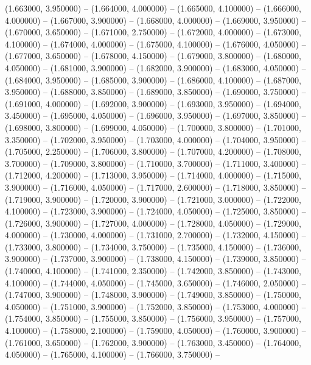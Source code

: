 (1.663000, 3.950000) -- 
(1.664000, 4.000000) -- 
(1.665000, 4.100000) -- 
(1.666000, 4.000000) -- 
(1.667000, 3.900000) -- 
(1.668000, 4.000000) -- 
(1.669000, 3.950000) -- 
(1.670000, 3.650000) -- 
(1.671000, 2.750000) -- 
(1.672000, 4.000000) -- 
(1.673000, 4.100000) -- 
(1.674000, 4.000000) -- 
(1.675000, 4.100000) -- 
(1.676000, 4.050000) -- 
(1.677000, 3.650000) -- 
(1.678000, 4.150000) -- 
(1.679000, 3.800000) -- 
(1.680000, 4.050000) -- 
(1.681000, 3.900000) -- 
(1.682000, 3.900000) -- 
(1.683000, 4.050000) -- 
(1.684000, 3.950000) -- 
(1.685000, 3.900000) -- 
(1.686000, 4.100000) -- 
(1.687000, 3.950000) -- 
(1.688000, 3.850000) -- 
(1.689000, 3.850000) -- 
(1.690000, 3.750000) -- 
(1.691000, 4.000000) -- 
(1.692000, 3.900000) -- 
(1.693000, 3.950000) -- 
(1.694000, 3.450000) -- 
(1.695000, 4.050000) -- 
(1.696000, 3.950000) -- 
(1.697000, 3.850000) -- 
(1.698000, 3.800000) -- 
(1.699000, 4.050000) -- 
(1.700000, 3.800000) -- 
(1.701000, 3.350000) -- 
(1.702000, 3.950000) -- 
(1.703000, 4.000000) -- 
(1.704000, 3.950000) -- 
(1.705000, 2.250000) -- 
(1.706000, 3.800000) -- 
(1.707000, 4.200000) -- 
(1.708000, 3.700000) -- 
(1.709000, 3.800000) -- 
(1.710000, 3.700000) -- 
(1.711000, 3.400000) -- 
(1.712000, 4.200000) -- 
(1.713000, 3.950000) -- 
(1.714000, 4.000000) -- 
(1.715000, 3.900000) -- 
(1.716000, 4.050000) -- 
(1.717000, 2.600000) -- 
(1.718000, 3.850000) -- 
(1.719000, 3.900000) -- 
(1.720000, 3.900000) -- 
(1.721000, 3.000000) -- 
(1.722000, 4.100000) -- 
(1.723000, 3.900000) -- 
(1.724000, 4.050000) -- 
(1.725000, 3.850000) -- 
(1.726000, 3.900000) -- 
(1.727000, 4.000000) -- 
(1.728000, 4.050000) -- 
(1.729000, 4.000000) -- 
(1.730000, 4.000000) -- 
(1.731000, 2.700000) -- 
(1.732000, 4.150000) -- 
(1.733000, 3.800000) -- 
(1.734000, 3.750000) -- 
(1.735000, 4.150000) -- 
(1.736000, 3.900000) -- 
(1.737000, 3.900000) -- 
(1.738000, 4.150000) -- 
(1.739000, 3.850000) -- 
(1.740000, 4.100000) -- 
(1.741000, 2.350000) -- 
(1.742000, 3.850000) -- 
(1.743000, 4.100000) -- 
(1.744000, 4.050000) -- 
(1.745000, 3.650000) -- 
(1.746000, 2.050000) -- 
(1.747000, 3.900000) -- 
(1.748000, 3.900000) -- 
(1.749000, 3.850000) -- 
(1.750000, 4.050000) -- 
(1.751000, 3.900000) -- 
(1.752000, 3.850000) -- 
(1.753000, 4.000000) -- 
(1.754000, 3.850000) -- 
(1.755000, 3.850000) -- 
(1.756000, 3.950000) -- 
(1.757000, 4.100000) -- 
(1.758000, 2.100000) -- 
(1.759000, 4.050000) -- 
(1.760000, 3.900000) -- 
(1.761000, 3.650000) -- 
(1.762000, 3.900000) -- 
(1.763000, 3.450000) -- 
(1.764000, 4.050000) -- 
(1.765000, 4.100000) -- 
(1.766000, 3.750000) -- 
